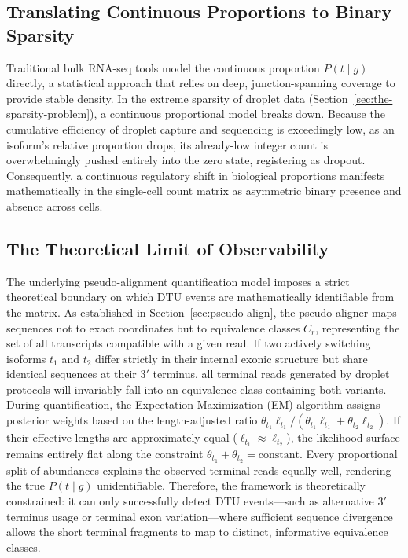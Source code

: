 \subsection{Translating Continuous Proportions to Binary Sparsity}

Traditional bulk RNA-seq tools model the continuous proportion $P(t \mid g)$ directly, a statistical approach that relies on deep, junction-spanning coverage to provide stable density. In the extreme sparsity of droplet data (Section~\ref{sec:the-sparsity-problem}), a continuous proportional model breaks down. Because the cumulative efficiency of droplet capture and sequencing is exceedingly low, as an isoform's relative proportion drops, its already-low integer count is overwhelmingly pushed entirely into the zero state, registering as \gls{dropout}. Consequently, a continuous regulatory shift in biological proportions manifests mathematically in the single-cell count matrix as asymmetric binary presence and absence across cells.

\subsection{The Theoretical Limit of Observability}

The underlying pseudo-alignment quantification model imposes a strict theoretical boundary on which DTU events are mathematically identifiable from the matrix. As established in Section~\ref{sec:pseudo-align}, the pseudo-aligner maps sequences not to exact coordinates but to equivalence classes $C_r$, representing the set of all transcripts compatible with a given read. If two actively switching isoforms $t_1$ and $t_2$ differ strictly in their internal exonic structure but share identical sequences at their $3'$ terminus, all terminal reads generated by droplet protocols will invariably fall into an equivalence class containing both variants. During quantification, the Expectation-Maximization (EM) algorithm assigns posterior weights based on the length-adjusted ratio $\theta_{t_1} \ell_{t_1} / (\theta_{t_1} \ell_{t_1} + \theta_{t_2} \ell_{t_2})$. If their effective lengths are approximately equal ($\ell_{t_1} \approx \ell_{t_2}$), the likelihood surface remains entirely flat along the constraint $\theta_{t_1} + \theta_{t_2} = \text{constant}$. Every proportional split of abundances explains the observed terminal reads equally well, rendering the true $P(t \mid g)$ unidentifiable. Therefore, the framework is theoretically constrained: it can only successfully detect DTU events---such as alternative $3'$ terminus usage or terminal exon variation---where sufficient sequence divergence allows the short terminal fragments to map to distinct, informative equivalence classes.


